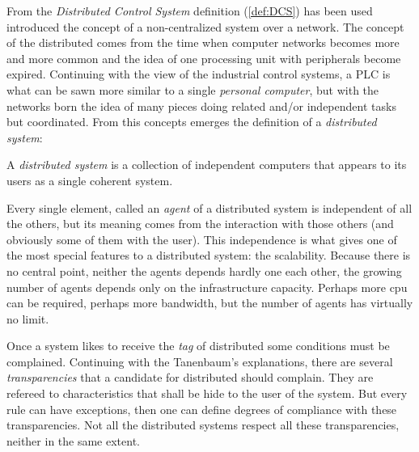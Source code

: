 \documentclass[10pt,a4paper,twoside]{llncs}
\begin{document}
From the \emph{Distributed Control System} definition (\ref{def:DCS}) has been used introduced the concept of a non-centralized system over a network. The concept of the distributed comes from the time when computer networks becomes more and more common and the idea of one processing unit with peripherals become expired. Continuing with the view of the industrial control systems, a PLC is what can be sawn more similar to a single \emph{personal computer}, but with the networks born the idea of many pieces doing related and/or independent tasks but coordinated. From this concepts emerges the definition of a \emph{distributed system}:

\begin{definition}\label{def:distributedSystem}
    A \emph{distributed system} is a collection of independent computers that appears to its users as a single coherent system.
\end{definition}

Every single element, called an \emph{agent} of a distributed system is independent of all the others, but its meaning comes from the interaction with those others (and obviously some of them with the user). This independence is what gives one of the most special features to a distributed system: the scalability. Because there is no central point, neither the agents depends hardly one each other, the growing number of agents depends only on the infrastructure capacity. Perhaps more cpu can be required, perhaps more bandwidth, but the number of agents has virtually no limit.

Once a system likes to receive the \emph{tag} of distributed some conditions must be complained. Continuing with the Tanenbaum's explanations, there are several \emph{transparencies} that a candidate for distributed should complain. They are refereed to characteristics that shall be hide to the user of the system. But every rule can have exceptions, then one can define degrees of compliance with these transparencies. Not all the distributed systems respect all these transparencies, neither in the same extent.
\end{document}
